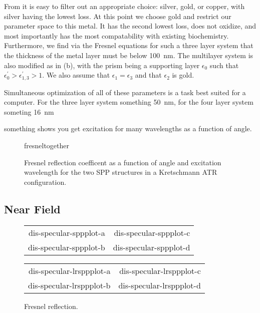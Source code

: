From  it is easy to filter out an appropriate
choice: silver, gold, or copper, with silver having the lowest loss.  At
this point we choose gold and restrict our parameter space to this metal.
It has the second lowest loss, does not oxidize, and most importantly has
the most compatability with existing biochemistry.  Furthermore, we find
via the Fresnel equations for such a three layer system that the thickness
of the metal layer must be below \SI{100}{\nano\meter}.  The multilayer
system is also modified as in (b), with the
prism being a supporting layer $\epsilon_0$ such that
$\epsilon^\prime_0>\epsilon^\prime_{1,3}>1$.  We also assume that
$\epsilon_1=\epsilon_3$ and that $\epsilon_2$ is gold.

Simultaneous optimization of all of these parameters is a task best suited
for a computer.  For the three layer system something \SI{50}{\nano\meter},
 for the four layer system someting \SI{16}{\nano\meter}

something  shows you get excitation for many
wavelengths as a function of angle.

\begin{figure}[ht]
\centering
{fresneltogether}
\caption{Fresnel reflection coefficent as a function of angle and
excitation wavelength for the two SPP structures in a Kretschmann ATR 
configuration.}
\label{fig:fresnelangle}
\end{figure}

\subsection{Near Field}
\begin{figure}[ht]
 \centering
 \pgfplotsset{
 minor tick num=3,
 footnotesize,
 trim axis right,
 max space between ticks=30pt,
}
\tikzset{baseline}
\begin{tabular}{rr}
{dis-specular-sppplot-a}&{dis-specular-sppplot-c}\\
{dis-specular-sppplot-b}&{dis-specular-sppplot-d}
\end{tabular}
\begin{tabular}{rr}
{dis-specular-lrsppplot-a}&{dis-specular-lrsppplot-c}\\
{dis-specular-lrsppplot-b}&{dis-specular-lrsppplot-d}
\end{tabular}

\label{fig:fresnellrsppfig}
\caption{Fresnel reflection.}
\end{figure}


